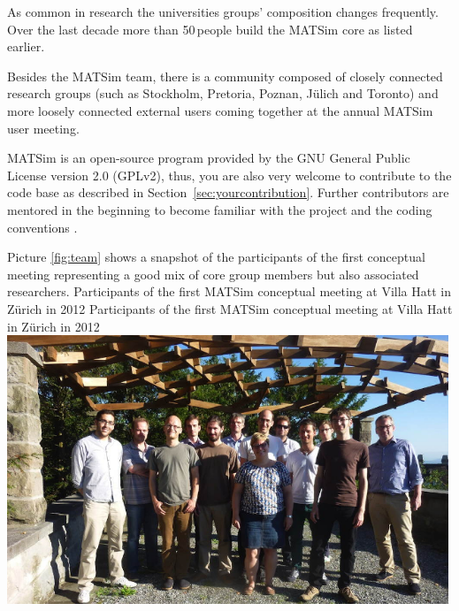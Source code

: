As common in research the universities groups' composition changes frequently. Over the last decade more than 50\,people build the MATSim core as listed earlier.

Besides the MATSim team, there is a community composed of closely connected research groups (such as Stockholm, Pretoria, Poznan, Jülich and Toronto) and more loosely connected external users coming together at the annual MATSim user meeting.   

MATSim is an open-source program provided by the GNU General Public License version 2.0 (GPLv2), thus, you are also very welcome to contribute to the code base as described in Section~\ref{sec:yourcontribution}. Further contributors are mentored in the beginning \citep[][]{MATSIM-T-BecomingAContributor_Webpage_2014} to become familiar with the project and the coding conventions \citep[][]{MATSIM-T-CodingGuide_Webpage_2014}.

Picture \ref{fig:team} shows a snapshot of the participants of the first conceptual meeting representing a good mix of core group members but also associated researchers.
%
\createfigure%
{Participants of the first MATSim conceptual meeting at Villa Hatt in Zürich in 2012}%
{Participants of the first MATSim conceptual meeting at Villa Hatt in Zürich in 2012}%
{\label{fig:team}}%
{\includegraphics[width=0.99\textwidth, angle=0]{extending/figures/ConceptualMeetingVillaHatt.png}}%
{}

